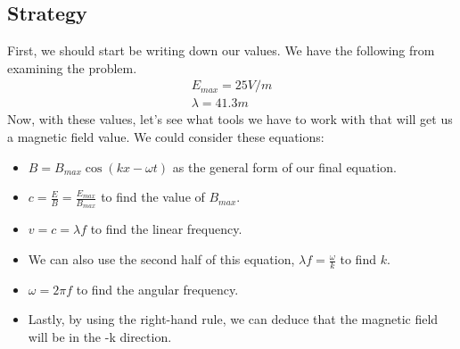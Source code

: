 \documentclass[12pt]{article}
\begin{document}
\subsection*{Strategy}
First, we should start be writing down our values. We have the following from examining the problem.
\begin{align*}
    E_{max} = 25V/m \\
    \lambda = 41.3m
\end{align*}
Now, with these values, let's see what tools we have to work with that will get us a magnetic field value. We could consider these equations:
\begin{itemize}
    \item \(B = B_{max}\cos{(kx-\omega t)}\) as the general form of our final equation.
    \item \(c = \frac{E}{B} = \frac{E_{max}}{B_{max}}\) to find the value of $B_{max}$.
    \item \(v = c = \lambda f\) to find the linear frequency.
    \item We can also use the second half of this equation, \(\lambda f = \frac{\omega}{k}\) to find $k$.
    \item \(\omega = 2\pi f\) to find the angular frequency.
    \item Lastly, by using the right-hand rule, we can deduce that the magnetic field will be in the -k direction.
\end{itemize}
\end{document}
